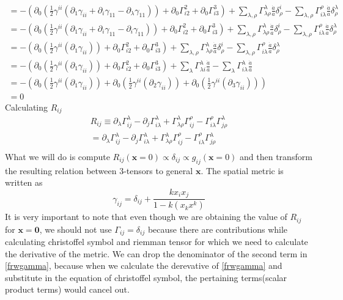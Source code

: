 \documentclass[12pt]{report}
\newcommand{\mbf}[1]{\mathbf{#1}}
\newcommand{\ch}[2]{\Gamma^{#1}_{#2}}
\newcommand{\p}{\partial}
\begin{document}
\begin{eqnarray*}
= - (\p_{0}(\frac{1}{2} \gamma^{i i}(\p_{1} \gamma_{i i}+\p_i  \gamma_{1 1} - \p_\lambda  \gamma_{11}))+ \p_{0}\ch{2}{i 2} + \p_{0}\ch{3}{i 3}) + \sum_{\lambda,\rho} \ch{\lambda}{\lambda \rho} \frac{\dot{a}}{a } \delta^i_\rho -\sum_{\lambda,\rho} \ch{\rho}{i \lambda} \frac{\dot{a}}{a } \delta^\lambda_\rho\\
= - (\p_{0}(\frac{1}{2} \gamma^{i i}(\p_{1} \gamma_{i i}+\p_i  \gamma_{1 1} - \p_i  \gamma_{11}))+ \p_{0}\ch{2}{i 2} + \p_{0}\ch{3}{i 3}) + \sum_{\lambda,\rho} \ch{\lambda}{\lambda \rho} \frac{\dot{a}}{a } \delta^i_\rho -\sum_{\lambda,\rho} \ch{\rho}{i \lambda} \frac{\dot{a}}{a } \delta^\lambda_\rho\\
= - (\p_{0}(\frac{1}{2} \gamma^{i i}(\p_{1} \gamma_{i i}))+ \p_{0}\ch{2}{i 2} + \p_{0}\ch{3}{i 3}) + \sum_{\lambda,\rho} \ch{\lambda}{\lambda \rho} \frac{\dot{a}}{a } \delta^i_\rho -\sum_{\lambda,\rho} \ch{\rho}{i \lambda} \frac{\dot{a}}{a } \delta^\lambda_\rho\\
= - (\p_{0}(\frac{1}{2} \gamma^{i i}(\p_{1} \gamma_{i i}))+ \p_{0}\ch{2}{i 2} + \p_{0}\ch{3}{i 3}) + \sum_{\lambda} \ch{\lambda}{\lambda i} \frac{\dot{a}}{a } -\sum_{\lambda} \ch{\lambda}{i \lambda} \frac{\dot{a}}{a } \\
= - (\p_{0}(\frac{1}{2} \gamma^{i i}(\p_{1} \gamma_{i i}))+ \p_{0}(\frac{1}{2} \gamma^{i i}(\p_{2} \gamma_{i i})) + \p_{0}(\frac{1}{2} \gamma^{i i}(\p_{3} \gamma_{i i})))\\
=0
\end{eqnarray*}
Calculating $R_{ij}$
\begin{eqnarray*}
R_{ij} \equiv \p_{\lambda}\ch{\lambda}{ij} - \p_{j}\ch{\lambda}{i \lambda} + \ch{\lambda}{\lambda \rho}\ch{\rho}{ij} - \ch{\rho}{i \lambda}\ch{\lambda}{j \rho}\\
=\p_{\lambda}\ch{\lambda}{ij} - \p_{j}\ch{\lambda}{i \lambda} + \ch{\lambda}{\lambda \rho}\ch{\rho}{ij} - \ch{\rho}{i \lambda}\ch{\lambda}{j \rho}\\
\end{eqnarray*}
What we will do is compute $R_{ij}(\mbf{x}=0) \propto \delta_{ij} \propto g_{ij}(\mbf{x}=0)$ and then transform the resulting relation between 3-tensors to general $\mbf{x}$.
The spatial metric is written as 
\begin{equation}\label{frwgamma}
\gamma_{ij}=\delta_{ij}+\frac{kx_i x_j}{1-k(x_k x^k)}
\end{equation}
It is very important to note that even though we are obtaining the value of $R_{ij}$ for $\mbf{x=0}$, we should not use $\Gamma_{ij}=\delta_{ij}$ because there are contributions while calculating christoffel symbol and riemman tensor for which we need to calculate the derivative of the metric. We can drop the denominator of the second term in \eqref{frwgamma}, because when we calculate the derevative of \eqref{frwgamma} and substitute in the equation of christoffel symbol, the pertaining terms(scalar product terms)  would cancel out. 
\end{document}
